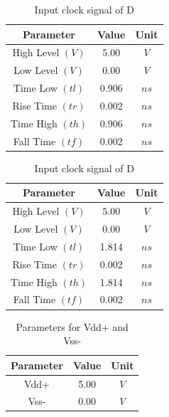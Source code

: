 \documentclass[a4paper,12pt]{article}
\begin{document}
\begin{table}[H]
			\begin{subtable}[t]{0.48\textwidth} %
			\centering
			\begin{tabular}{|c|c|c|}
				\hline
				\textbf{Parameter}          & \textbf{Value} & \textbf{Unit} \\ \hline
				High Level $(V)$            & 5.00           & $V$           \\ \hline
				Low Level $(V)$             & 0.00           & $V$           \\ \hline
				Time Low $(tl)$             & 0.906          & $ns$          \\ \hline
				Rise Time $(tr)$            & 0.002          & $ns$          \\ \hline
				Time High $(th)$            & 0.906          & $ns$          \\ \hline
				Fall Time $(tf)$            & 0.002          & $ns$          \\ \hline
			\end{tabular}
			
			\caption{Input clock signal of C} %
		\end{subtable}
		\hfil
			\begin{subtable}[t]{0.48\textwidth} %
			\centering
			\begin{tabular}{|c|c|c|}
				\hline
				\textbf{Parameter}          & \textbf{Value} & \textbf{Unit} \\ \hline
				High Level $(V)$            & 5.00           & $V$           \\ \hline
				Low Level $(V)$             & 0.00           & $V$           \\ \hline
				Time Low $(tl)$             & 1.814          & $ns$          \\ \hline
				Rise Time $(tr)$            & 0.002          & $ns$          \\ \hline
				Time High $(th)$            & 1.814         & $ns$          \\ \hline
				Fall Time $(tf)$            & 0.002          & $ns$          \\ \hline
			\end{tabular}
			
			\caption{Input clock signal of D} %
		\end{subtable}
	\end{table}
	

	\begin{table}[H]
		\centering
		\caption{Parameters for Vdd+ and Vss- }
		\begin{tabular}{|c|c|c|}
			\hline
			\textbf{Parameter} & \textbf{Value} & \textbf{Unit} \\ \hline
			Vdd+               & 5.00           & $V $            \\ \hline
			Vss-               & 0.00           & $V$             \\ \hline
		\end{tabular}
		
	\end{table}
	
\end{document}
